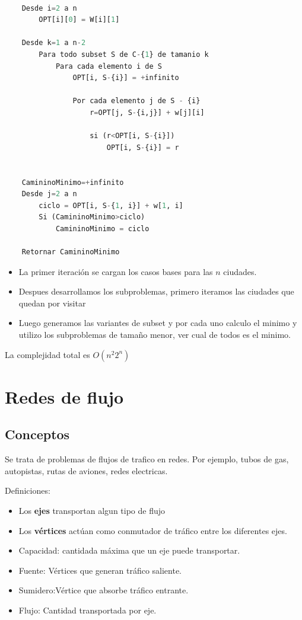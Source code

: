 \documentclass{article}
\begin{document}
\begin{lstlisting}[language=Python, caption=Solución iterativa]

    Desde i=2 a n
        OPT[i][0] = W[i][1]
    
    Desde k=1 a n-2
        Para todo subset S de C-{1} de tamanio k
            Para cada elemento i de S
                OPT[i, S-{i}] = +infinito

                Por cada elemento j de S - {i}
                    r=OPT[j, S-{i,j}] + w[j][i]

                    si (r<OPT[i, S-{i}])
                        OPT[i, S-{i}] = r

    
    CamininoMinimo=+infinito
    Desde j=2 a n
        ciclo = OPT[i, S-{1, i}] + w[1, i]
        Si (CamininoMinimo>ciclo)
            CamininoMinimo = ciclo
    
    Retornar CamininoMinimo

\end{lstlisting}

\begin{itemize}
    \item La primer iteración se cargan los casos bases para las \(n\) ciudades.
    \item Despues desarrollamos los subproblemas, primero iteramos las ciudades que quedan por visitar
    \item Luego generamos las variantes de subset y por cada uno calculo el minimo y 
    utilizo los subproblemas de tamaño menor, ver cual de todos es el minimo.
\end{itemize}

La complejidad total es \(O(n^2 2^n)\)

\newpage
\section{Redes de flujo}

\subsection{Conceptos}

Se trata de problemas de flujos de trafico en redes. 
Por ejemplo, tubos de gas, autopistas, rutas de aviones, redes electricas.

Definiciones:
\begin{itemize}
    \item Los \textbf{ejes} transportan algun tipo de flujo
    \item Los \textbf{vértices} actúan como conmutador de tráfico entre los diferentes ejes.
    \item Capacidad: cantidada máxima que un eje puede transportar.
    \item Fuente: Vértices que generan tráfico saliente.
    \item Sumidero:Vértice que absorbe tráfico entrante.
    \item Flujo: Cantidad transportada por eje.
\end{itemize}
\end{document}
